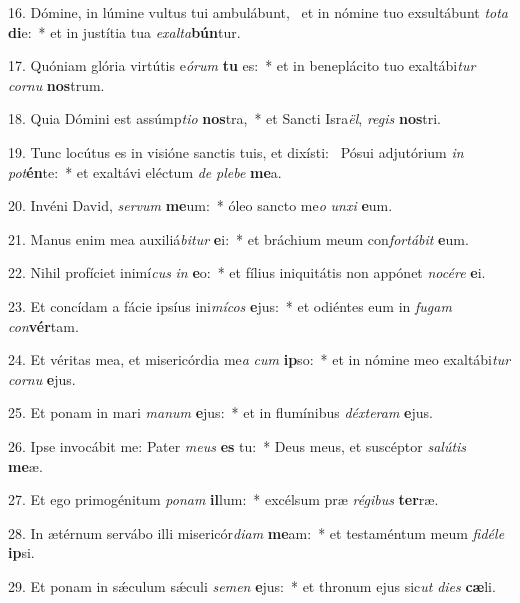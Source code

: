 16. Dómine, in lúmine vultus tui ambulábunt, \dag\  et in nómine tuo exsultábunt \textit{to}\textit{ta} \textbf{di}e:~*  et in justítia tua \textit{ex}\textit{al}\textit{ta}\textbf{bún}tur.\

17. Quóniam glória virtútis e\textit{ó}\textit{rum} \textbf{tu} es:~*  et in beneplácito tuo exaltábi\textit{tur} \textit{cor}\textit{nu} \textbf{nos}trum.\

18. Quia Dómini est assúmp\textit{ti}\textit{o} \textbf{nos}tra,~*  et Sancti Isra\textit{ël}, \textit{re}\textit{gis} \textbf{nos}tri.\

19. Tunc locútus es in visióne sanctis tuis, et dixísti: \dag\  Pósui adjutórium \textit{in} \textit{pot}\textbf{én}te:~*  et exaltávi eléctum \textit{de} \textit{ple}\textit{be} \textbf{me}a.\

20. Invéni David, \textit{ser}\textit{vum} \textbf{me}um:~*  óleo sancto me\textit{o} \textit{un}\textit{xi} \textbf{e}um.\

21. Manus enim mea auxiliá\textit{bi}\textit{tur} \textbf{e}i:~*  et bráchium meum con\textit{for}\textit{tá}\textit{bit} \textbf{e}um.\

22. Nihil profíciet inimí\textit{cus} \textit{in} \textbf{e}o:~*  et fílius iniquitátis non appónet \textit{no}\textit{cé}\textit{re} \textbf{e}i.\

23. Et concídam a fácie ipsíus ini\textit{mí}\textit{cos} \textbf{e}jus:~*  et odiéntes eum in \textit{fu}\textit{gam} \textit{con}\textbf{vér}tam.\

24. Et véritas mea, et misericórdia me\textit{a} \textit{cum} \textbf{ip}so:~*  et in nómine meo exaltábi\textit{tur} \textit{cor}\textit{nu} \textbf{e}jus.\

25. Et ponam in mari \textit{ma}\textit{num} \textbf{e}jus:~*  et in flumínibus \textit{déx}\textit{te}\textit{ram} \textbf{e}jus.\

26. Ipse invocábit me: Pater \textit{me}\textit{us} \textbf{es} tu:~*  Deus meus, et suscéptor \textit{sa}\textit{lú}\textit{tis} \textbf{me}æ.\

27. Et ego primogénitum \textit{po}\textit{nam} \textbf{il}lum:~*  excélsum præ \textit{ré}\textit{gi}\textit{bus} \textbf{ter}ræ.\

28. In ætérnum servábo illi misericór\textit{di}\textit{am} \textbf{me}am:~*  et testaméntum meum \textit{fi}\textit{dé}\textit{le} \textbf{ip}si.\

29. Et ponam in sǽculum sǽculi \textit{se}\textit{men} \textbf{e}jus:~*  et thronum ejus sic\textit{ut} \textit{di}\textit{es} \textbf{cæ}li.\


